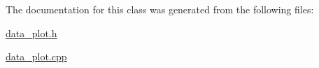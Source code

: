 The documentation for this class was generated from the following files:\begin{DoxyCompactItemize}
\item 
\hyperlink{data__plot_8h}{data\_\-plot.h}\item 
\hyperlink{data__plot_8cpp}{data\_\-plot.cpp}\end{DoxyCompactItemize}
